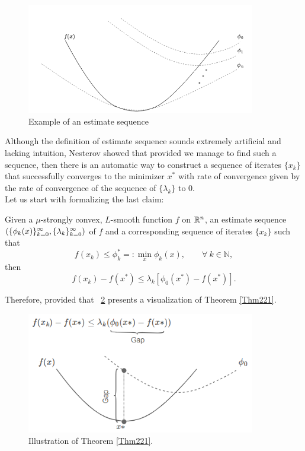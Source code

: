 \documentclass{article}
\begin{document}
\begin{figure}
  \centering
  \includegraphics[width=10cm]{images/estimate_sequence1.png}
  \caption{Example of an estimate sequence}
  \label{figEstim}
\end{figure}


Although the definition of estimate sequence sounds extremely artificial and lacking intuition, Nesterov showed that provided we manage to find such a sequence, then there is an automatic way to construct a sequence of iterates $\{x_k\}$ that successfully converges to the minimizer $x^\ast$ with rate of convergence given by the rate of convergence of the sequence of $\{\lambda_k\}$ to 0.\\

Let us start with formalizing the last claim:


\begin{thm}\label{Thm221}

Given a $\mu$-strongly convex, $L$-smooth function $f$ on $\mathbb{R}^n$, an estimate sequence $\left( \{\phi_k(x)\}_{k=0}^\infty, \{\lambda_k\}_{k=0}^\infty \right)$ of $f$ and a corresponding sequence of iterates $\{x_k\}$ such that 
$$f(x_k) \leq \phi_{k}^{\ast} =: \min\limits_{x} \phi_k (x), \qquad \forall \ k \in \mathbb{N},$$ 
then
\[
	f(x_k) - f(x^*) \leq \lambda_k \left[ \phi_0(x^*) - f(x^*) \right].
\]
\end{thm}

Therefore, provided that 
\figurename \ \ref{Thm221plot} presents a visualization of Theorem \ref{Thm221}. 
\begin{figure}
  \centering
  \includegraphics[width=10cm]{images/gap1.PNG}
  \caption{Illustration of Theorem \ref{Thm221}.\label{Thm221plot}}
\end{figure}
\newline
\end{document}
